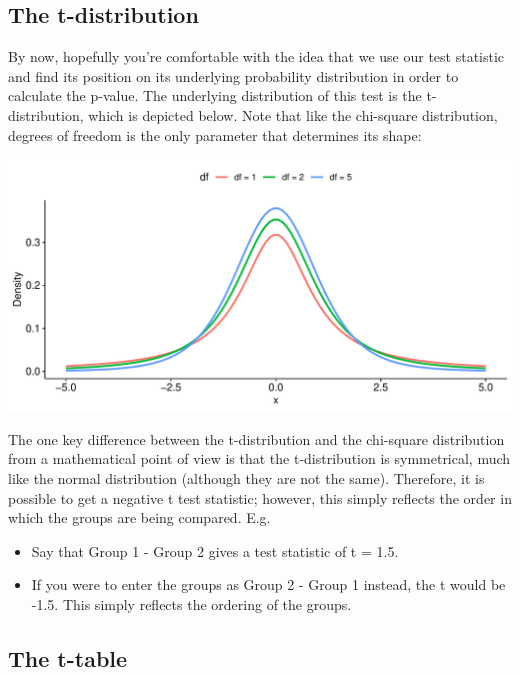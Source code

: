 \documentclass[
]{book}
\providecommand{\tightlist}{%
  \setlength{\itemsep}{0pt}\setlength{\parskip}{0pt}}
\begin{document}
\hypertarget{the-t-distribution}{%
\subsection{The t-distribution}\label{the-t-distribution}}

By now, hopefully you're comfortable with the idea that we use our test statistic and find its position on its underlying probability distribution in order to calculate the p-value. The underlying distribution of this test is the t-distribution, which is depicted below. Note that like the chi-square distribution, degrees of freedom is the only parameter that determines its shape:

\includegraphics{_main_files/figure-latex/unnamed-chunk-117-1.pdf}

The one key difference between the t-distribution and the chi-square distribution from a mathematical point of view is that the t-distribution is symmetrical, much like the normal distribution (although they are not the same). Therefore, it is possible to get a negative t test statistic; however, this simply reflects the order in which the groups are being compared. E.g.

\begin{itemize}
\tightlist
\item
  Say that Group 1 - Group 2 gives a test statistic of t = 1.5.
\item
  If you were to enter the groups as Group 2 - Group 1 instead, the t would be -1.5. This simply reflects the ordering of the groups.
\end{itemize}

\hypertarget{the-t-table}{%
\subsection{The t-table}\label{the-t-table}}
\end{document}
